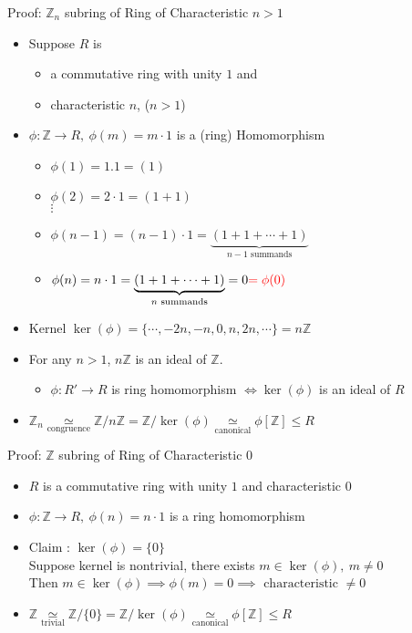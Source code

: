 \documentclass{beamer}
\begin{document}
\begin{frame}{Proof: $\mathbb{Z}_n$ subring of Ring of Characteristic $n > 1$}
\begin{itemize}
	\item Suppose $R$ is
	\begin{itemize}
		\item a commutative ring with unity $1$ and 
		\item characteristic $n$, ($n > 1$)
	\end{itemize}
	\item $\phi : \mathbb{Z} \to R,\ \phi(m) = m \cdot 1$ is a (ring) Homomorphism
	\begin{itemize}
		\item $\phi(1) = 1.1 = (1)$
		\item $\phi(2) = 2 \cdot 1 = (1+1) $ \\
		$\vdots$
		\item $\phi(n-1) = (n-1) \cdot 1 = \underbrace{(1+1+\cdots+1)}_{\text{$n-1$ summands}}$
		\item $\phi(n) = n \cdot 1 = \underbrace{(1+1+\cdots+1)}_{\text{$n$ summands}} = 0 {\color{red} = \phi(0)}$
	\end{itemize}
	\item {\color{blue}Kernel $\ker(\phi) = \{ \cdots,-2n,-n,0,n,2n,\cdots\} = n\mathbb{Z}$}
	\item {\color{blue}For any $n>1$, $n\mathbb{Z}$ is an ideal of $\mathbb{Z}$.}
	\begin{itemize}
		\item $\phi : R' \to R$ is ring homomorphism $\iff \ker(\phi)$ is an ideal of $R$
	\end{itemize}
\item $\mathbb{Z}_n \underset{\text{congruence}}{\simeq} \mathbb{Z}/n\mathbb{Z} = \mathbb{Z}/\ker(\phi) \underset{\text{canonical}}{\simeq} \phi[\mathbb{Z}] \le R$
\end{itemize}
\end{frame}
\begin{frame}{Proof: $\mathbb{Z}$ subring of Ring of Characteristic $0$ }
\begin{itemize}
	\item $R$ is a commutative ring with unity $1$ and characteristic $0$
	\item $\phi : \mathbb{Z} \to R,\ \phi(n) = n \cdot 1$ is a ring homomorphism
	\item Claim : $\ker(\phi) = \{ 0 \}$\\
		Suppose kernel is nontrivial, there exists $m \in \ker(\phi),\ m \ne 0$\\
		Then $m \in \ker(\phi) \implies \phi(m) = 0 \implies \text{ characteristic } \ne 0 $
	\item $\mathbb{Z} \underset{\text{trivial}}{\simeq} \mathbb{Z}/\{0\} = \mathbb{Z}/\ker(\phi) \underset{\text{canonical}}{\simeq} \phi[\mathbb{Z}] \le R$
\end{itemize}
\end{frame}
\end{document}
